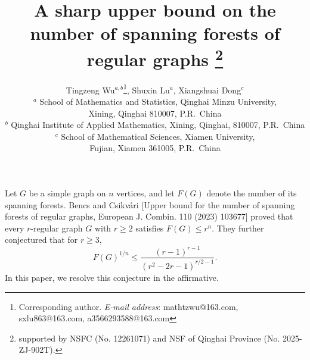 \documentclass[11pt, a4paper]{article}
\begin{document}
\theoremstyle{plain}
\newtheorem{theorem}{ Theorem\ }[section]
\newtheorem{corollary}{Corollary\ }[section]
\newtheorem{lemma}{Lemma\ }[section]
\newtheorem{prop}{Proposition\ }[section]
\newtheorem{defi}{Definition\ }[section]
\newtheorem{property}{Property\ }[section]
\newtheorem{remark}{Remark\ }[section]
\newtheorem{example}{Example\ }[section]
\newtheorem{exercise}{Exercise\ }[section]
\newtheorem{conjecture}{Conjecture\ }[section]
\newtheorem{problem}{Problem\ }[section]

\renewcommand{\proofname}{\bf Proof}

\renewcommand{\proofname}{Proof}

\newenvironment{proofthm}[1]
{\begin{proof}[\textbf{#1}]}
{\end{proof}}
\renewcommand{\figurename}{Figure}
\renewcommand\refname{\centering References}


\allowdisplaybreaks

\baselineskip 15pt
\renewcommand{\baselinestretch}{1.2}
\title
{\LARGE \textbf{A sharp upper bound on the number of spanning forests of regular graphs
\thanks{ supported by NSFC (No. 12261071) and NSF of Qinghai Province (No. 2025-ZJ-902T).} 
}}

\author{Tingzeng Wu$^{a,b}$\thanks{{Corresponding author.\newline
\emph{E-mail address}: mathtzwu@163.com, sxlu863@163.com, a3566293588@163.com
}}, Shuxin Lu$^a$, Xiangshuai Dong$^c$ \\
{\small $^{a}$ School of Mathematics and Statistics, Qinghai Minzu University, }\\
{\small  Xining, Qinghai 810007, P.R.~China} \\
{\small $^{b}$ Qinghai Institute of Applied Mathematics,   Xining, Qinghai, 810007, P.R.~China}\\
{\small $^{c}$ School of Mathematical Sciences, Xiamen University,  }\\
{\small  Fujian, Xiamen 361005,  P.R.~China} \\
}


\date{}
\maketitle



Let $G$ be a simple graph on $n$ vertices, and let $F(G)$ denote the number of its spanning forests. 
Bencs and Csikvári [Upper bound for the number of spanning forests of regular graphs, European J. Combin. 110 (2023) 103677] proved that every $r$-regular graph $G$ with $r\geq 2$ satisfies $F(G) \leq r^{n}$. 
They further conjectured that for $r \geq 3$, 
\[
F(G)^{1/n} \leq \frac{(r - 1)^{r-1}}{(r^2 - 2r - 1)^{r/2-1}}.
\]
In this paper, we resolve this conjecture in the affirmative.
\\
\end{document}
